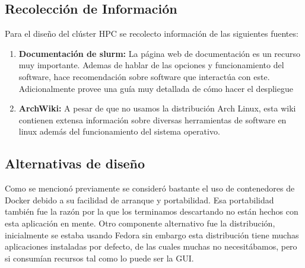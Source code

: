 \subsection{Recolección de Información}
Para el diseño del clúster HPC se recolecto información de las siguientes fuentes:
\begin{enumerate}
    \item  \textbf{Documentación de slurm: }La página web de documentación es un recurso muy importante. Ademas de hablar de las opciones y funcionamiento del software, hace recomendación sobre software que interactúa con este. Adicionalmente provee una guía muy detallada de cómo hacer el despliegue
    \item \textbf{ArchWiki: }A pesar de que no usamos la distribución Arch Linux, esta wiki contienen extensa información sobre diversas herramientas de software en linux además del funcionamiento del sistema operativo.
\end{enumerate}

\subsection{Alternativas de diseño}
Como se mencionó previamente se consideró bastante el uso de contenedores de Docker debido a su facilidad de arranque y portabilidad. Esa portabilidad también fue la razón por la que los terminamos descartando no están hechos con esta aplicación en mente. Otro componente alternativo fue la distribución, inicialmente se estaba usando Fedora sin embargo esta distribución tiene muchas aplicaciones instaladas por defecto, de las cuales muchas no necesitábamos, pero si consumían recursos tal como lo puede ser la GUI.
